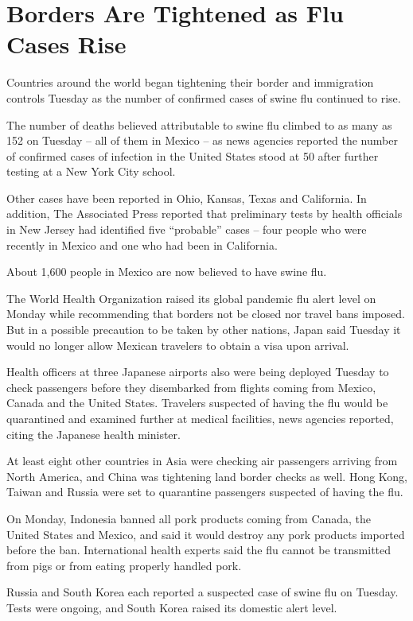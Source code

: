 \documentclass[12pt,a4paper,onecolumn]{article}
\begin{document}
\section{Borders Are Tightened as Flu Cases Rise}

Countries around the world began tightening their border and immigration controls Tuesday as the
number of confirmed cases of swine flu continued to rise.

The number of deaths believed attributable to swine flu climbed to as many as 152 on Tuesday -- all
of them in Mexico -- as news agencies reported the number of confirmed cases of infection in the
United States stood at 50 after further testing at a New York City school.

Other cases have been reported in Ohio, Kansas, Texas and California. In addition, The Associated
Press reported that preliminary tests by health officials in New Jersey had identified five
``probable'' cases -- four people who were recently in Mexico and one who had been in California.

About 1,600 people in Mexico are now believed to have swine flu.

The World Health Organization raised its global pandemic flu alert level on Monday while
recommending that borders not be closed nor travel bans imposed. But in a possible precaution to be
taken by other nations, Japan said Tuesday it would no longer allow Mexican travelers to obtain a
visa upon arrival.

Health officers at three Japanese airports also were being deployed Tuesday to check passengers
before they disembarked from flights coming from Mexico, Canada and the United States. Travelers
suspected of having the flu would be quarantined and examined further at medical facilities, news
agencies reported, citing the Japanese health minister.

At least eight other countries in Asia were checking air passengers arriving from North America, and
China was tightening land border checks as well. Hong Kong, Taiwan and Russia were set to quarantine
passengers suspected of having the flu.

On Monday, Indonesia banned all pork products coming from Canada, the United States and Mexico, and
said it would destroy any pork products imported before the ban. International health experts said
the flu cannot be transmitted from pigs or from eating properly handled pork.

Russia and South Korea each reported a suspected case of swine flu on Tuesday. Tests were ongoing,
and South Korea raised its domestic alert level.
\end{document}
